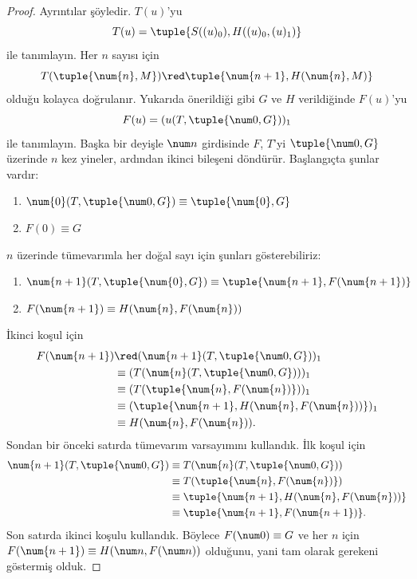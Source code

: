 \documentclass[../../../include/open-logic-section]{subfiles}
\begin{document}
\begin{proof}
Ayrıntılar şöyledir. $T(u)$'yu
\[
T(u) = \tuple{S((u)_0), H((u)_0,(u)_1)}
\]
ile tanımlayın. Her $n$ sayısı için
\[
T(\tuple{\num{n}, M}) \red \tuple{\num{n+1}, H(\num{n}, M)}
\]
olduğu kolayca doğrulanır. Yukarıda önerildiği gibi $G$ ve $H$ verildiğinde
$F(u)$'yu
\[
F(u) = (u(T,\tuple{\num 0, G}))_1
\]
ile tanımlayın. Başka bir deyişle $\num n$ girdisinde $F$, $T$'yi
$\tuple{\num 0,G}$ üzerinde $n$ kez yineler, ardından ikinci bileşeni
döndürür. Başlangıçta şunlar vardır:
\begin{enumerate}
\item $\num{0} (T, \tuple{\num 0, G}) \equiv \tuple{\num{0}, G}$
\item $F(\num{0}) \equiv G$
\end{enumerate}
$n$ üzerinde tümevarımla her doğal sayı için şunları gösterebiliriz:
\begin{enumerate}
\item $\num{n+1}(T, \tuple{\num{0}, G}) \equiv \tuple{\num{n+1}, F(\num{n+1})}$
\item $F(\num{n+1}) \equiv H(\num{n}, F(\num{n}))$
\end{enumerate}
İkinci koşul için
\begin{align*}
F(\num{n+1}) & \red (\num{n+1}(T, \tuple{\num 0, G}))_1 \\
& \equiv (T(\num{n} (T, \tuple{\num 0, G})))_1 \\
& \equiv (T(\tuple{\num{n}, F(\num{n})}))_1 \\
& \equiv (\tuple{\num{n+1}, H(\num{n}, F(\num{n}))})_1 \\
& \equiv H(\num{n}, F(\num{n})).
\end{align*}
Sondan bir önceki satırda tümevarım varsayımını kullandık. İlk koşul için
\begin{align*}
\num{n+1} (T, \tuple{\num 0, G}) &
\equiv T(\num{n} (T, \tuple{\num 0, G})) \\
& \equiv T( \tuple{\num{n}, F(\num{n})}) \\
& \equiv \tuple{\num{n+1}, H(\num{n}, F(\num{n}))} \\
& \equiv \tuple{\num{n+1}, F(\num{n+1})}.
\end{align*}
Son satırda ikinci koşulu kullandık. Böylece $F(\num 0)\equiv G$ ve her $n$
için $F(\num{n+1})\equiv H(\num n,F(\num n))$ olduğunu, yani tam olarak
gerekeni göstermiş olduk.
\end{proof}
\end{document}
